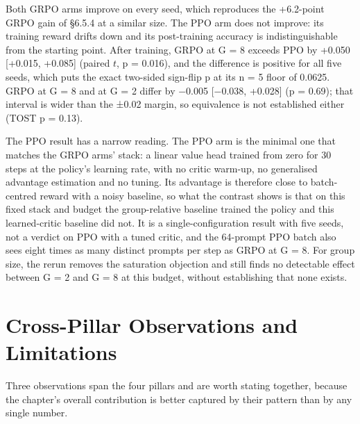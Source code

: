 \documentclass[12pt,a4paper]{report}
\begin{document}
Both GRPO arms improve on every seed, which reproduces the +6.2-point
GRPO gain of §6.5.4 at a similar size. The PPO arm does not improve: its
training reward drifts down and its post-training accuracy is
indistinguishable from the starting point. After training, GRPO at G = 8
exceeds PPO by +0.050 {[}+0.015, +0.085{]} (paired \(t\), p = 0.016),
and the difference is positive for all five seeds, which puts the exact
two-sided sign-flip p at its n = 5 floor of 0.0625. GRPO at G = 8 and at
G = 2 differ by −0.005 {[}−0.038, +0.028{]} (p = 0.69); that interval is
wider than the ±0.02 margin, so equivalence is not established either
(TOST p = 0.13).

The PPO result has a narrow reading. The PPO arm is the minimal one that
matches the GRPO arms' stack: a linear value head trained from zero for
30 steps at the policy's learning rate, with no critic warm-up, no
generalised advantage estimation and no tuning. Its advantage is
therefore close to batch-centred reward with a noisy baseline, so what
the contrast shows is that on this fixed stack and budget the
group-relative baseline trained the policy and this learned-critic
baseline did not. It is a single-configuration result with five seeds,
not a verdict on PPO with a tuned critic, and the 64-prompt PPO batch
also sees eight times as many distinct prompts per step as GRPO at G =
8. For group size, the rerun removes the saturation objection and still
finds no detectable effect between G = 2 and G = 8 at this budget,
without establishing that none exists.

\section{Cross-Pillar Observations and
Limitations}\label{cross-pillar-observations-and-limitations}

Three observations span the four pillars and are worth stating together,
because the chapter's overall contribution is better captured by their
pattern than by any single number.
\end{document}
